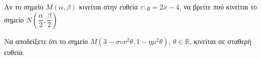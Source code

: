 \documentclass{presentation}
\begin{document}
\begin{askisi}
  Αν το σημείο $Μ(α,β)$ κινείται στην ευθεία $ε:y=2x-4$, να βρείτε πού κινείται το σημείο $Ν\left(  \dfrac{α}{2},\dfrac{β}{2}\right)$
\end{askisi}

\begin{askisi}
  Να αποδείξετε ότι το σημείο $Μ(3-συν^2θ,1-ημ^2θ)$, $θ\in\mathbb{R}$, κινείται σε σταθερή ευθεία.
\end{askisi}

\moodle
\end{document}
